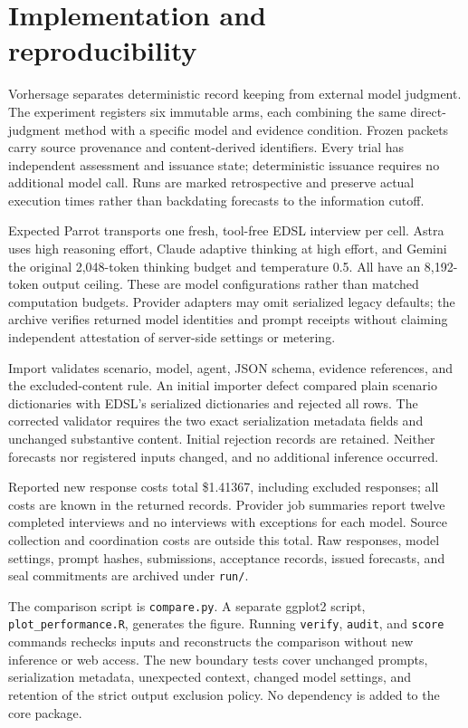 \documentclass[11pt]{article}
\begin{document}
\section{Implementation and reproducibility}
Vorhersage separates deterministic record keeping from external model judgment.
The experiment registers six immutable arms, each combining the same
direct-judgment method with a specific model and evidence condition. Frozen
packets carry source provenance and content-derived identifiers. Every trial
has independent assessment and issuance state; deterministic issuance requires
no additional model call. Runs are marked retrospective and preserve actual
execution times rather than backdating forecasts to the information cutoff.

Expected Parrot transports one fresh, tool-free EDSL interview per cell. Astra
uses high reasoning effort, Claude adaptive thinking at high effort, and Gemini
the original 2,048-token thinking budget and temperature 0.5. All have an
8,192-token output ceiling. These are model configurations rather than matched
computation budgets. Provider adapters may omit serialized legacy defaults;
the archive verifies returned model identities and prompt receipts without
claiming independent attestation of server-side settings or metering.

Import validates scenario, model, agent, JSON schema, evidence references, and
the excluded-content rule. An initial importer defect compared plain scenario
dictionaries with EDSL's serialized dictionaries and rejected all rows. The
corrected validator requires the two exact serialization metadata fields and
unchanged substantive content. Initial rejection records are retained. Neither
forecasts nor registered inputs changed, and no additional inference occurred.

Reported new response costs total \$1.41367, including excluded responses; all
costs are known in the returned records. Provider job summaries report twelve
completed interviews and no interviews with exceptions for each model. Source
collection and coordination costs are outside this total. Raw responses, model
settings, prompt hashes, submissions, acceptance records, issued forecasts,
and seal commitments are archived under \texttt{run/}.

The comparison script is \texttt{compare.py}. A separate ggplot2 script,
\texttt{plot\_performance.R}, generates the figure. Running \texttt{verify}, \texttt{audit},
and \texttt{score} commands rechecks inputs and reconstructs the comparison
without new inference or web access. The new boundary tests cover unchanged
prompts, serialization metadata, unexpected context, changed model settings,
and retention of the strict output exclusion policy. No dependency is added to
the core package.
\end{document}
